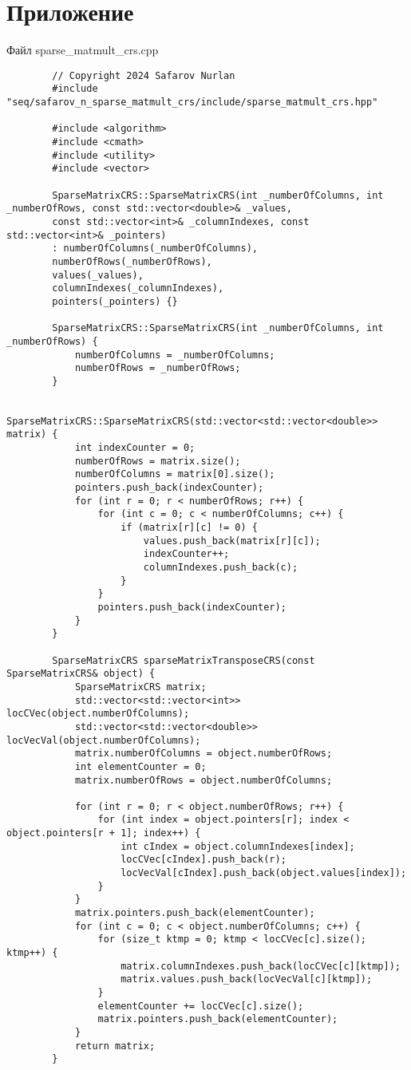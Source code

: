 \documentclass[a4paper, 14pt]{article}
\begin{document}
	\section*{\centering Приложение}
	Файл sparse\_matmult\_crs.cpp
	\begin{verbatim}
		// Copyright 2024 Safarov Nurlan
		#include "seq/safarov_n_sparse_matmult_crs/include/sparse_matmult_crs.hpp"
		
		#include <algorithm>
		#include <cmath>
		#include <utility>
		#include <vector>
		
		SparseMatrixCRS::SparseMatrixCRS(int _numberOfColumns, int _numberOfRows, const std::vector<double>& _values,
		const std::vector<int>& _columnIndexes, const std::vector<int>& _pointers)
		: numberOfColumns(_numberOfColumns),
		numberOfRows(_numberOfRows),
		values(_values),
		columnIndexes(_columnIndexes),
		pointers(_pointers) {}
		
		SparseMatrixCRS::SparseMatrixCRS(int _numberOfColumns, int _numberOfRows) {
			numberOfColumns = _numberOfColumns;
			numberOfRows = _numberOfRows;
		}
		
		SparseMatrixCRS::SparseMatrixCRS(std::vector<std::vector<double>> matrix) {
			int indexCounter = 0;
			numberOfRows = matrix.size();
			numberOfColumns = matrix[0].size();
			pointers.push_back(indexCounter);
			for (int r = 0; r < numberOfRows; r++) {
				for (int c = 0; c < numberOfColumns; c++) {
					if (matrix[r][c] != 0) {
						values.push_back(matrix[r][c]);
						indexCounter++;
						columnIndexes.push_back(c);
					}
				}
				pointers.push_back(indexCounter);
			}
		}
		
		SparseMatrixCRS sparseMatrixTransposeCRS(const SparseMatrixCRS& object) {
			SparseMatrixCRS matrix;
			std::vector<std::vector<int>> locCVec(object.numberOfColumns);
			std::vector<std::vector<double>> locVecVal(object.numberOfColumns);
			matrix.numberOfColumns = object.numberOfRows;
			int elementCounter = 0;
			matrix.numberOfRows = object.numberOfColumns;
			
			for (int r = 0; r < object.numberOfRows; r++) {
				for (int index = object.pointers[r]; index < object.pointers[r + 1]; index++) {
					int cIndex = object.columnIndexes[index];
					locCVec[cIndex].push_back(r);
					locVecVal[cIndex].push_back(object.values[index]);
				}
			}
			matrix.pointers.push_back(elementCounter);
			for (int c = 0; c < object.numberOfColumns; c++) {
				for (size_t ktmp = 0; ktmp < locCVec[c].size(); ktmp++) {
					matrix.columnIndexes.push_back(locCVec[c][ktmp]);
					matrix.values.push_back(locVecVal[c][ktmp]);
				}
				elementCounter += locCVec[c].size();
				matrix.pointers.push_back(elementCounter);
			}
			return matrix;
		}
		

\end{verbatim}
\end{document}
